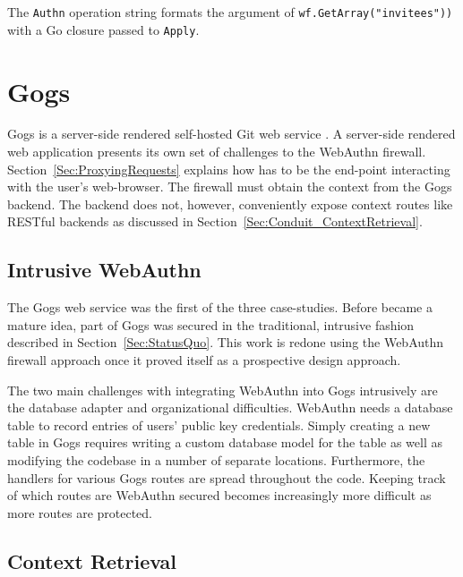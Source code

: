 The \lstinline{Authn} operation string formats the argument of \lstinline{wf.GetArray("invitees"))} with a Go closure passed to \lstinline{Apply}.

\section{Gogs}

Gogs is a server-side rendered self-hosted Git web service \cite{gogs}. A server-side rendered web application presents its own set of challenges to the WebAuthn firewall. Section~\ref{Sec:ProxyingRequests} explains how \sys{} has to be the end-point interacting with the user's web-browser. The firewall must obtain the context from the Gogs backend. The backend does not, however, conveniently expose context routes like RESTful backends as discussed in Section~\ref{Sec:Conduit_ContextRetrieval}.


\subsection{Intrusive WebAuthn}

The Gogs web service was the first of the three case-studies. Before \sys{} became a mature idea, part of Gogs was secured in the traditional, intrusive fashion described in Section~\ref{Sec:StatusQuo}. This work is redone using the WebAuthn firewall approach once it proved itself as a prospective design approach.

The two main challenges with integrating WebAuthn into Gogs intrusively are the database adapter and organizational difficulties. WebAuthn needs a database table to record entries of users' public key credentials. Simply creating a new table in Gogs requires writing a custom database model for the table as well as modifying the codebase in a number of separate locations. Furthermore, the handlers for various Gogs routes are spread throughout the code. Keeping track of which routes are WebAuthn secured becomes increasingly more difficult as more routes are protected.


\subsection{Context Retrieval}

